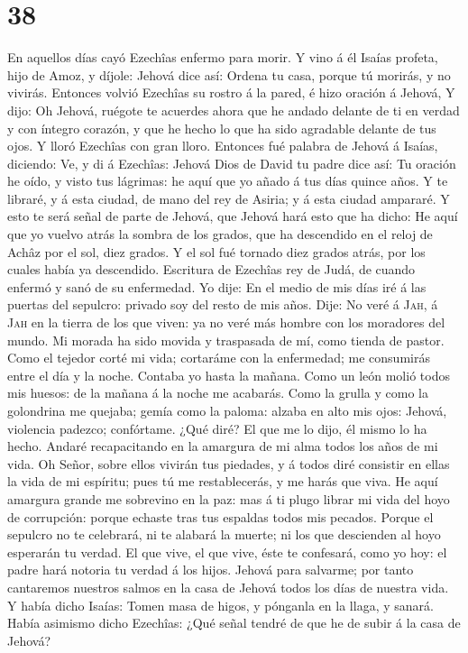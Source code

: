 \hypertarget{section-37}{%
\section{38}\label{section-37}}

 En aquellos días cayó Ezechîas enfermo para morir. Y vino
á él Isaías profeta, hijo de Amoz, y díjole: Jehová dice así: Ordena tu
casa, porque tú morirás, y no vivirás.  Entonces volvió
Ezechîas su rostro á la pared, é hizo oración á Jehová,  Y
dijo: Oh Jehová, ruégote te acuerdes ahora que he andado delante de ti
en verdad y con íntegro corazón, y que he hecho lo que ha sido agradable
delante de tus ojos. Y lloró Ezechîas con gran lloro. 
Entonces fué palabra de Jehová á Isaías, diciendo:  Ve, y
di á Ezechîas: Jehová Dios de David tu padre dice así: Tu oración he
oído, y visto tus lágrimas: he aquí que yo añado á tus días quince años.
 Y te libraré, y á esta ciudad, de mano del rey de Asiria;
y á esta ciudad ampararé.  Y esto te será señal de parte
de Jehová, que Jehová hará esto que ha dicho:  He aquí que
yo vuelvo atrás la sombra de los grados, que ha descendido en el reloj
de Achâz por el sol, diez grados. Y el sol fué tornado diez grados
atrás, por los cuales había ya descendido.  Escritura de
Ezechîas rey de Judá, de cuando enfermó y sanó de su enfermedad.
 Yo dije: En el medio de mis días iré á las puertas del
sepulcro: privado soy del resto de mis años.  Dije: No
veré á \textsc{Jah}, á \textsc{Jah} en la tierra de los que viven: ya no
veré más hombre con los moradores del mundo.  Mi morada
ha sido movida y traspasada de mí, como tienda de pastor. Como el
tejedor corté mi vida; cortaráme con la enfermedad; me consumirás entre
el día y la noche.  Contaba yo hasta la mañana. Como un
león molió todos mis huesos: de la mañana á la noche me acabarás.
 Como la grulla y como la golondrina me quejaba; gemía
como la paloma: alzaba en alto mis ojos: Jehová, violencia padezco;
confórtame.  ¿Qué diré? El que me lo dijo, él mismo lo ha
hecho. Andaré recapacitando en la amargura de mi alma todos los años de
mi vida.  Oh Señor, sobre ellos vivirán tus piedades, y á
todos diré consistir en ellas la vida de mi espíritu; pues tú me
restablecerás, y me harás que viva.  He aquí amargura
grande me sobrevino en la paz: mas á ti plugo librar mi vida del hoyo de
corrupción: porque echaste tras tus espaldas todos mis pecados.
 Porque el sepulcro no te celebrará, ni te alabará la
muerte; ni los que descienden al hoyo esperarán tu verdad.
 El que vive, el que vive, éste te confesará, como yo
hoy: el padre hará notoria tu verdad á los hijos.  Jehová
para salvarme; por tanto cantaremos nuestros salmos en la casa de Jehová
todos los días de nuestra vida.  Y había dicho Isaías:
Tomen masa de higos, y pónganla en la llaga, y sanará. 
Había asimismo dicho Ezechîas: ¿Qué señal tendré de que he de subir á la
casa de Jehová?

